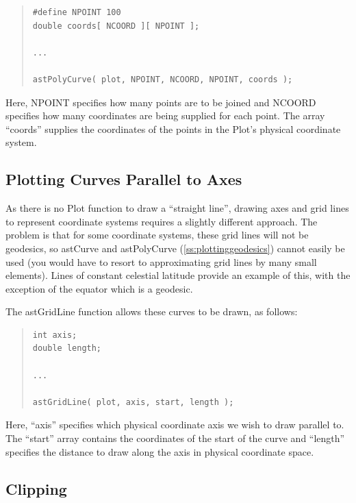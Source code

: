 \documentclass[twoside,11pt]{article}
\newcommand{\htmlref}[2]{#1}
\newcommand{\secref}[1]{\S\ref{#1}}
\renewcommand{\secref}[1]{\ref{#1}}
\begin{document}
\begin{quote}
\small
\begin{verbatim}
#define NPOINT 100
double coords[ NCOORD ][ NPOINT ];

...

astPolyCurve( plot, NPOINT, NCOORD, NPOINT, coords );
\end{verbatim}
\normalsize
\end{quote}

Here, NPOINT specifies how many points are to be joined and NCOORD
specifies how many coordinates are being supplied for each point.  The
array ``coords'' supplies the coordinates of the points in the Plot's
physical coordinate system.

\subsection{Plotting Curves Parallel to Axes}

As there is no \htmlref{Plot}{Plot} function to draw a ``straight line'', drawing axes
and grid lines to represent coordinate systems requires a slightly
different approach. The problem is that for some coordinate systems,
these grid lines will not be geodesics, so \htmlref{astCurve}{astCurve} and \htmlref{astPolyCurve}{astPolyCurve}
(\secref{ss:plottinggeodesics}) cannot easily be used (you would have
to resort to approximating grid lines by many small elements). Lines
of constant celestial latitude provide an example of this, with the
exception of the equator which is a geodesic.

The \htmlref{astGridLine}{astGridLine} function allows these curves to be drawn, as follows:

\begin{quote}
\small
\begin{verbatim}
int axis;
double length;

...

astGridLine( plot, axis, start, length );
\end{verbatim}
\normalsize
\end{quote}

Here, ``axis'' specifies which physical coordinate axis we wish to
draw parallel to. The ``start'' array contains the coordinates of the
start of the curve and ``length'' specifies the distance to draw along
the axis in physical coordinate space.

\subsection{\label{ss:clipping}Clipping}
\end{document}
